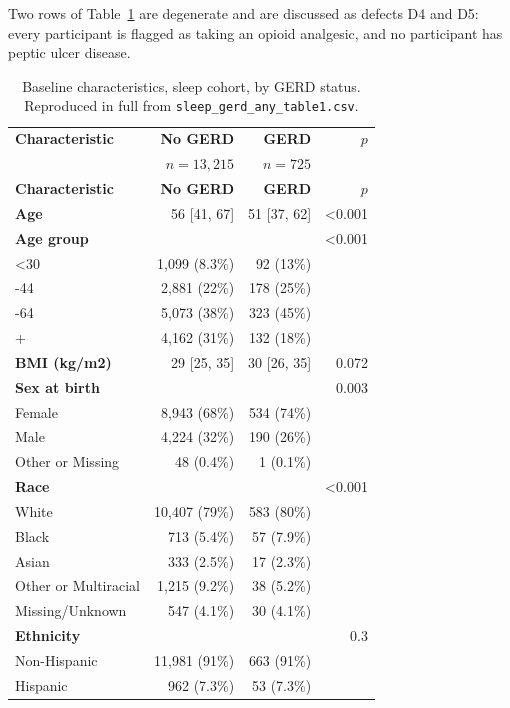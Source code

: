 \documentclass[11pt]{article}
\newcommand{\code}[1]{\texttt{\small #1}}
\begin{document}
Two rows of Table~\ref{tab:res-t1} are degenerate and are discussed as defects D4 and D5: every
participant is flagged as taking an opioid analgesic, and no participant has peptic ulcer disease.


\begin{longtable}{@{}p{6.0cm}rrr@{}}
\caption{Baseline characteristics, sleep cohort, by GERD status. Reproduced in full from \code{sleep\_gerd\_any\_table1.csv}.}\label{tab:res-t1}\\
\toprule \textbf{Characteristic} & \textbf{No GERD} & \textbf{GERD} & \textbf{$p$} \\
 & $n=13{,}215$ & $n=725$ & \\ \midrule \endfirsthead
\toprule \textbf{Characteristic} & \textbf{No GERD} & \textbf{GERD} & \textbf{$p$} \\ \midrule \endhead
\textbf{Age} & 56 [41, 67] & 51 [37, 62] & <0.001 \\
\textbf{Age group} &  &  & <0.001 \\
\quad <30 & 1,099 (8.3\%) & 92 (13\%) &  \\
\quad 30-44 & 2,881 (22\%) & 178 (25\%) &  \\
\quad 45-64 & 5,073 (38\%) & 323 (45\%) &  \\
\quad 65+ & 4,162 (31\%) & 132 (18\%) &  \\
\textbf{BMI (kg/m2)} & 29 [25, 35] & 30 [26, 35] & 0.072 \\
\textbf{Sex at birth} &  &  & 0.003 \\
\quad Female & 8,943 (68\%) & 534 (74\%) &  \\
\quad Male & 4,224 (32\%) & 190 (26\%) &  \\
\quad Other or Missing & 48 (0.4\%) & 1 (0.1\%) &  \\
\textbf{Race} &  &  & <0.001 \\
\quad White & 10,407 (79\%) & 583 (80\%) &  \\
\quad Black & 713 (5.4\%) & 57 (7.9\%) &  \\
\quad Asian & 333 (2.5\%) & 17 (2.3\%) &  \\
\quad Other or Multiracial & 1,215 (9.2\%) & 38 (5.2\%) &  \\
\quad Missing/Unknown & 547 (4.1\%) & 30 (4.1\%) &  \\
\textbf{Ethnicity} &  &  & 0.3 \\
\quad Non-Hispanic & 11,981 (91\%) & 663 (91\%) &  \\
\quad Hispanic & 962 (7.3\%) & 53 (7.3\%) &  \\

\end{longtable}
\end{document}
